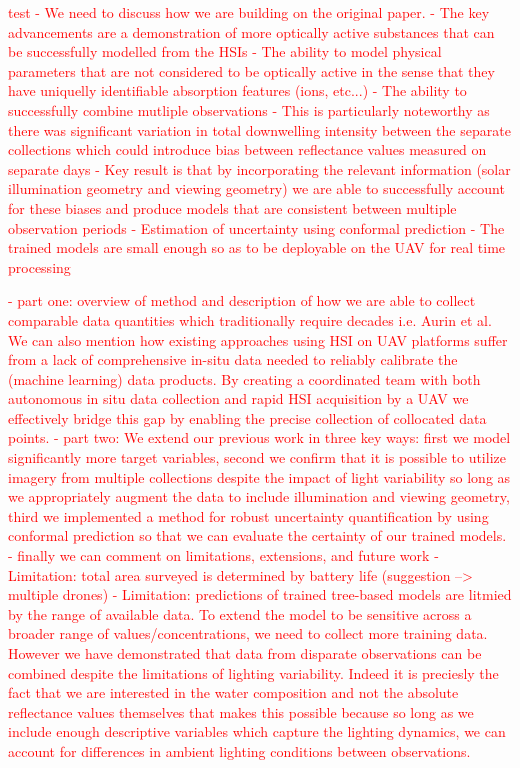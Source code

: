 \documentclass[remotesensing,article,submit,pdftex,moreauthors]{Definitions/mdpi}
\begin{document}

\textcolor{red}{test
- We need to discuss how we are building on the original paper. 
- The key advancements are a demonstration of more optically active substances that can be successfully modelled from the HSIs 
- The ability to model physical parameters that are not considered to be optically active in the sense that they have uniquelly identifiable absorption features (ions, etc...) 
- The ability to successfully combine mutliple observations
    - This is particularly noteworthy as there was significant variation in total downwelling intensity between the separate collections which could introduce bias between reflectance values measured on separate days
    - Key result is that by incorporating the relevant information (solar illumination geometry and viewing geometry) we are able to successfully account for these biases and produce models that are consistent between multiple observation periods
- Estimation of uncertainty using conformal prediction
- The trained models are small enough so as to be deployable on the UAV for real time processing

- part one: overview of method and description of how we are able to collect comparable data quantities which traditionally require decades i.e. Aurin et al. We can also mention how existing approaches using HSI on UAV platforms suffer from a lack of comprehensive in-situ data needed to reliably calibrate the (machine learning) data products. By creating a coordinated team with both autonomous in situ data collection and rapid HSI acquisition by a UAV we effectively bridge this gap by enabling the precise collection of collocated data points.
- part two: We extend our previous work in three key ways: first we model significantly more target variables, second we confirm that it is possible to utilize imagery from multiple collections despite the impact of light variability so long as we appropriately augment the data to include illumination and viewing geometry, third we implemented a method for robust uncertainty quantification by using conformal prediction so that we can evaluate the certainty of our trained models.
- finally we can comment on limitations, extensions, and future work
    - Limitation: total area surveyed is determined by battery life (suggestion --> multiple drones) 
    - Limitation: predictions of trained tree-based models are litmied by the range of available data. To extend the model to be sensitive across a broader range of values/concentrations, we need to collect more training data. However we have demonstrated that data from disparate observations can be combined despite the limitations of lighting variability. Indeed it is preciesly the fact that we are interested in the water composition and not the absolute reflectance values themselves that makes this possible because so long as we include enough descriptive variables which capture the lighting dynamics, we can account for differences in ambient lighting conditions between observations.
}
\end{document}
